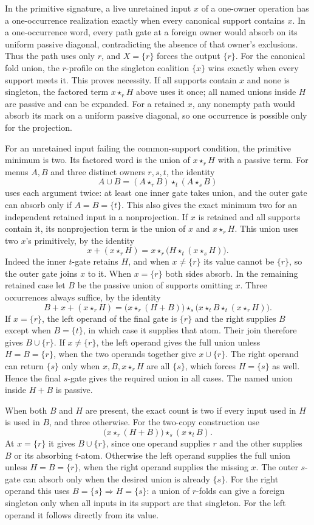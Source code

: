 In the primitive signature, a live unretained
input $x$ of a one-owner operation has a one-occurrence
realization exactly when every canonical support
contains $x$. In a one-occurrence word, every
path gate at a foreign owner would absorb on its
uniform passive diagonal, contradicting the
absence of that owner's exclusions. Thus the
path uses only $r$, and $X=\{r\}$ forces the
output $\{r\}$. For the canonical fold union,
the $r$-profile on the singleton coalition
$\{x\}$ wins exactly when every support meets
it. This proves necessity. If all supports
contain $x$ and none is singleton, the factored
term $x\star_r H$ above uses it once; all named
unions inside $H$ are passive and can be expanded.
For a retained $x$, any nonempty path would
absorb its mark on a uniform passive diagonal,
so one occurrence is possible only for the
projection.

For an unretained input failing the common-support
condition, the primitive minimum is two. Its
factored word is the union of $x\star_r H$ with a
passive term. For menus $A,B$ and three distinct
owners $r,s,t$, the identity
\[
 A\cup B=(A\star_r B)\star_t(A\star_s B)
\]
uses each argument twice: at least one inner gate
takes union, and the outer gate can absorb only
if $A=B=\{t\}$. This also gives the exact minimum
two for an independent retained input in a
nonprojection. If $x$ is retained and all supports
contain it, its nonprojection term is the union of
$x$ and $x\star_r H$. This union uses two $x$'s
primitively, by the identity
\[
 x+(x\star_r H)=x\star_r\bigl(H\star_t(x\star_s H)\bigr).
\]
Indeed the inner $t$-gate retains $H$, and when
$x\ne\{r\}$ its value cannot be $\{r\}$, so the
outer gate joins $x$ to it. When $x=\{r\}$ both
sides absorb. In the remaining retained case let
$B$ be the passive union of supports omitting $x$.
Three occurrences always suffice, by the identity
\[
 B+x+(x\star_r H)=
 \bigl(x\star_r(H+B)\bigr)\star_s
 \bigl(x\star_t B\star_t(x\star_r H)\bigr).
\]
If $x=\{r\}$, the left operand of the final gate
is $\{r\}$ and the right supplies $B$ except when
$B=\{t\}$, in which case it supplies that atom.
Their join therefore gives $B\cup\{r\}$. If
$x\ne\{r\}$, the left operand gives the full union
unless $H=B=\{r\}$, when the two operands together
give $x\cup\{r\}$. The right operand can return
$\{s\}$ only when $x,B,x\star_r H$ are all
$\{s\}$, which forces $H=\{s\}$ as well. Hence
the final $s$-gate gives the required union in
all cases. The named union inside $H+B$ is passive.

When both $B$ and $H$ are present, the exact count
is two if every input used in $H$ is used in $B$,
and three otherwise. For the two-copy construction
use
\[
 \bigl(x\star_r(H+B)\bigr)\star_s(x\star_t B).
\]
At $x=\{r\}$ it gives $B\cup\{r\}$, since one
operand supplies $r$ and the other supplies $B$
or its absorbing $t$-atom. Otherwise the left
operand supplies the full union unless
$H=B=\{r\}$, when the right operand supplies
the missing $x$. The outer $s$-gate can absorb
only when the desired union is already $\{s\}$.
For the right operand this uses
$B=\{s\}\Rightarrow H=\{s\}$: a union of
$r$-folds can give a foreign singleton only when
all inputs in its support are that singleton.
For the left operand it follows directly from
its value.

